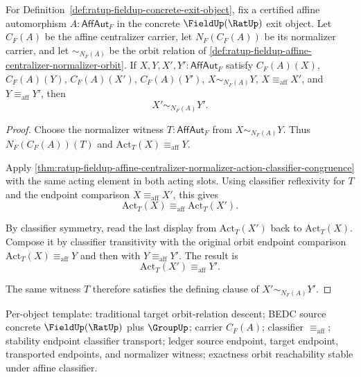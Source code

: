 \begin{theorem}
\label{thm:ratup-fieldup-affine-centralizer-normalizer-orbit-classifier-transport}
For Definition~\ref{def:ratup-fieldup-concrete-exit-object}, fix a certified
affine automorphism $A:\mathsf{AffAut}_F$ in the concrete $\FieldUp(\RatUp)$
exit object. Let $C_F(A)$ be the affine centralizer carrier, let
$N_F(C_F(A))$ be its normalizer carrier, and let $\sim_{N_F(A)}$ be the orbit
relation of
\autoref{def:ratup-fieldup-affine-centralizer-normalizer-orbit}. If
$X,Y,X',Y':\mathsf{AffAut}_F$ satisfy $C_F(A)(X)$, $C_F(A)(Y)$,
$C_F(A)(X')$, $C_F(A)(Y')$, $X\sim_{N_F(A)}Y$,
$X\equiv_{\mathrm{aff}}X'$, and $Y\equiv_{\mathrm{aff}}Y'$, then
$$
X'\sim_{N_F(A)}Y'.
$$
\end{theorem}
\begin{proof}
Choose the normalizer witness $T:\mathsf{AffAut}_F$ from
$X\sim_{N_F(A)}Y$. Thus $N_F(C_F(A))(T)$ and
$\mathrm{Act}_T(X)\equiv_{\mathrm{aff}}Y$.

Apply
\autoref{thm:ratup-fieldup-affine-centralizer-normalizer-action-classifier-congruence}
with the same acting element in both acting slots. Using classifier reflexivity
for $T$ and the endpoint comparison $X\equiv_{\mathrm{aff}}X'$, this gives
$$
\mathrm{Act}_T(X)\equiv_{\mathrm{aff}}\mathrm{Act}_T(X').
$$

By classifier symmetry, read the last display from $\mathrm{Act}_T(X')$ back
to $\mathrm{Act}_T(X)$. Compose it by classifier transitivity with the
original orbit endpoint comparison
$\mathrm{Act}_T(X)\equiv_{\mathrm{aff}}Y$ and then with
$Y\equiv_{\mathrm{aff}}Y'$. The result is
$$
\mathrm{Act}_T(X')\equiv_{\mathrm{aff}}Y'.
$$

The same witness $T$ therefore satisfies the defining clause of
$X'\sim_{N_F(A)}Y'$.
\end{proof}

Per-object template: traditional target orbit-relation descent; BEDC source
concrete $\FieldUp(\RatUp)$ plus $\GroupUp$; carrier $C_F(A)$; classifier
$\equiv_{\mathrm{aff}}$; stability endpoint classifier transport; ledger
source endpoint, target endpoint, transported endpoints, and normalizer
witness; exactness orbit reachability stable under affine classifier.
